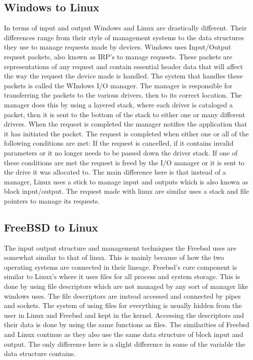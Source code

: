 \documentclass[onecolumn, draftclsnofoot, 10pt, titlepage, compsoc]{IEEEtran}
\begin{document}
\subsection{Windows to Linux}
In terms of input and output Windows and Linux are drastically different. Their differences range from their style of management systems to the data structures they use to manage requests made by devices. Windows uses Input/Output request packets, also known as IRP’s to manage requests. These packets are representations of any request and contain essential header data that will affect the way the request the device made is handled. The system that handles these packets is called the WIndows I/O manager. The manager is responsible for transferring the packets to the various drivers, then to its correct location. The manager does this by using a layered stack, where each driver is cataloged a packet, then it is sent to the bottom of the stack to either one or many different drivers. When the request is completed the manager notifies the application that it has initiated the packet. The request is completed when either one or all of the following conditions are met: If the request is cancelled, if it contains invalid parameters or it no longer needs to be passed down the driver stack. If one of these conditions are met the request is freed by the I/O manager or it is sent to the drive it was allocated to. The main difference here is that instead of a manager, Linux uses a stick to manage input and outputs which is also known as block input/output. The request made with linux are similar uses a stack and file pointers to manage its requests. \\

\subsection{FreeBSD to Linux}
The input output structure and management techniques the Freebsd uses are somewhat similar to that of linux. This is mainly because of how the two operating systems are connected in their lineage. Freebsd’s core component is similar to Linux’s where it uses files for all process and system storage. This is done by using file descriptors which are not managed by any sort of manager like windows uses. The file descriptors are instead accessed and connected by pipes and sockets. The system of using files for everything is usually hidden from the user in Linux and Freebsd and kept in the kernel. Accessing the descriptors and their data is done by using the same functions as files. The similarities of Freebsd and Linux continue as they also use the same data structure of block input and output. The only difference here is a slight difference in some of the variable the data structure contains.\\
\end{document}
